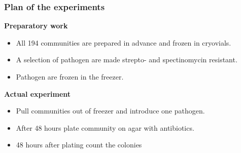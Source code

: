 \documentclass[11pt]{beamer}
\begin{document}
\begin{frame}
\frametitle{Plan of the experiments}
\textbf{Preparatory work}\\

\begin{itemize}
\item All 194 communities are prepared in advance and frozen in cryovials. 
\item A selection of pathogen are made strepto- and spectinomycin resistant.
\item Pathogen are frozen in the freezer.
\end{itemize}

\textbf{Actual experiment}
\begin{itemize}
\item Pull communities out of freezer and introduce one pathogen.
\item After 48 hours plate community on agar with antibiotics.
\item 48 hours after plating count the colonies
\end{itemize}
\end{frame}
\end{document}
